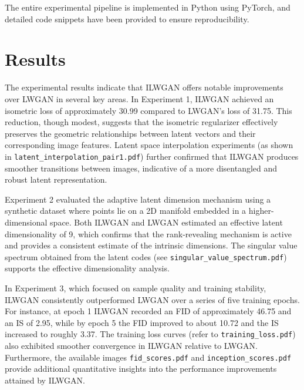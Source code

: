 \documentclass{article} %
\begin{document}
The entire experimental pipeline is implemented in Python using PyTorch\citep{Wagemans2012}, and detailed code snippets have been provided to ensure reproducibility.

\section{Results}
\label{sec:results}
The experimental results indicate that ILWGAN offers notable improvements over LWGAN in several key areas. In Experiment 1, ILWGAN achieved an isometric loss of approximately 30.99 compared to LWGAN’s loss of 31.75. This reduction, though modest, suggests that the isometric regularizer effectively preserves the geometric relationships between latent vectors and their corresponding image features. Latent space interpolation experiments (as shown in \texttt{latent_interpolation_pair1.pdf}) further confirmed that ILWGAN produces smoother transitions between images, indicative of a more disentangled and robust latent representation.

Experiment 2 evaluated the adaptive latent dimension mechanism using a synthetic dataset where points lie on a 2D manifold embedded in a higher-dimensional space. Both ILWGAN and LWGAN estimated an effective latent dimensionality of 9, which confirms that the rank-revealing mechanism is active and provides a consistent estimate of the intrinsic dimensions. The singular value spectrum obtained from the latent codes (see \texttt{singular_value_spectrum.pdf}) supports the effective dimensionality analysis.

In Experiment 3, which focused on sample quality and training stability, ILWGAN consistently outperformed LWGAN over a series of five training epochs. For instance, at epoch 1 ILWGAN recorded an FID of approximately 46.75 and an IS of 2.95, while by epoch 5 the FID improved to about 10.72 and the IS increased to roughly 3.37. The training loss curves (refer to \texttt{training_loss.pdf}) also exhibited smoother convergence in ILWGAN relative to LWGAN. Furthermore, the available images \texttt{fid_scores.pdf} and \texttt{inception_scores.pdf} provide additional quantitative insights into the performance improvements attained by ILWGAN.
\end{document}
